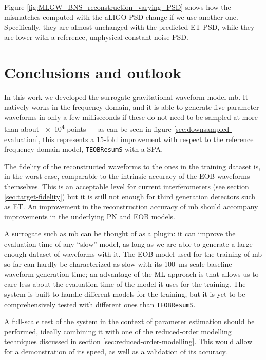 \documentclass[main.tex]{subfiles}
\begin{document}
Figure \ref{fig:MLGW_BNS_reconstruction_varying_PSD} shows how the mismatches computed with the \ac{aLIGO} \ac{PSD} change if we use another one. 
Specifically, they are almost unchanged with the predicted \ac{ET} \ac{PSD}, while they are lower with a reference, unphysical constant noise \ac{PSD}.


\chapter{Conclusions and outlook}


In this work we developed the surrogate gravitational waveform model \ac{mb}.
It natively works in the frequency domain, and it is able to generate five-parameter waveforms in only a few milliseconds if these do not need to be sampled at more than about \num{e4} points --- as can be seen in figure \ref{sec:downsampled-evaluation}, this represents a 15-fold improvement with respect to the reference frequency-domain model, \texttt{TEOBResumS} with a \ac{SPA}.

The fidelity of the reconstructed waveforms to the ones in the training dataset is, in the worst case, comparable to the intrinsic accuracy of the \ac{EOB} waveforms themselves. 
This is an acceptable level for current interferometers (see section \ref{sec:target-fidelity}) but it is still not enough for third generation detectors such as \ac{ET}. 
An improvement in the reconstruction accuracy of \ac{mb} should accompany improvements in the underlying \ac{PN} and \ac{EOB} models.

A surrogate such as \ac{mb} can be thought of as a plugin: it can improve the evaluation time of any ``slow'' model, as long as we are able to generate a large enough dataset of waveforms with it. 
The \ac{EOB} model used for the training of \ac{mb} so far can hardly be characterized as slow with its \SI{100}{ms}-scale baseline waveform generation time; an advantage of the \ac{ML} approach is that allows us to care less about the evaluation time of the model it uses for the training. 
The system is built to handle different models for the training, but it is yet to be comprehensively tested with different ones than \texttt{TEOBResumS}.

A full-scale test of the system in the context of parameter estimation should be performed, ideally combining it with one of the reduced-order modelling techniques discussed in section \ref{sec:reduced-order-modelling}.
This would allow for a demonstration of its speed, as well as a validation of its accuracy.
\end{document}
